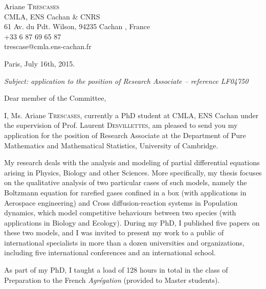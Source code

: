 \documentclass[11pt]{letter}
\begin{document}
\begin{letter}{Ariane \textsc{Trescases}\\
CMLA, ENS Cachan \& CNRS\\
61 Av. du Pdt. Wilson, 94235 Cachan , France\\
+33 6 87 69 65 87\\
{\ttfamily trescase@cmla.ens-cachan.fr}}
\date{}
\opening{}

\begin{flushright}
Paris, July 16th, 2015.
\end{flushright}

\vspace{0.8cm}
\emph{Subject: application to the position of Research Associate -- reference LF04750}

\vspace{0.8cm}
 
Dear member of the Committee,
 
\vspace{0.8cm}

I, Ms. Ariane \textsc{Trescases}, currently a PhD student at CMLA, ENS Cachan under the supervision of Prof. Laurent \textsc{Desvillettes}, am pleased to send you my application for the position of Research Associate at the Department of Pure Mathematics and Mathematical Statistics, University of Cambridge.

\vspace{0.4cm}

\quad My research deals with the analysis and modeling of partial differential equations arising in Physics, Biology and other Sciences. More specifically, my thesis focuses on the qualitative analysis of two particular cases of such models, namely the Boltzmann equation for rarefied gases confined in a box (with applications in Aerospace engineering) and Cross diffusion-reaction systems in Population dynamics, which model competitive behaviours between two species (with applications in Biology and Ecology). During my PhD, I published five papers on these two models, and I was invited to present my work to a public of international specialists in more than a dozen universities and organizations, including five international conferences and an international school.
 
\vspace{0.4cm}

\quad As part of my PhD, I taught a load of 128 hours in total in the class of Preparation to the French \emph{Agr\' egation} (provided to Master students).


\end{letter}
\end{document}
